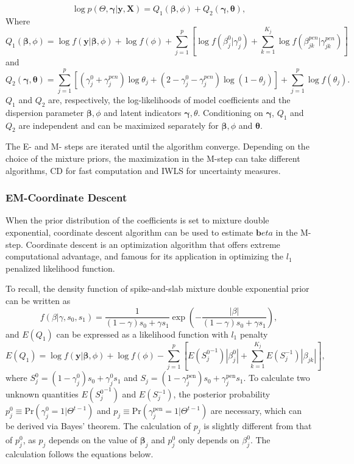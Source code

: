 \documentclass[AMA,STIX1COL,]{WileyNJD-v2}
\begin{document}
\[ \log p(\Theta, \boldsymbol{\gamma}| \textbf{y}, \textbf{X}) = Q_1(\boldsymbol{\beta}, \phi) + Q_2 (\boldsymbol{\gamma},\boldsymbol{\theta}),\]
Where
\[ Q_1(\boldsymbol{\beta}, \phi) = \log f(\textbf{y}|\boldsymbol{\beta}, \phi) + \log f(\phi) + \sum\limits_{j=1}^p\left[\log f(\beta^0_j|\gamma^0_j)+\sum\limits_{k=1}^{K_j} \log f(\beta^{pen}_{jk}|\gamma^{pen}_{jk})\right]\]
and \[
Q_2(\boldsymbol{\gamma},\boldsymbol{\theta}) = \sum\limits_{j=1}^{p} \left[ (\gamma^0_j+\gamma_{j}^{pen})\log \theta_j + (2-\gamma^0_j-\gamma_{j}^{pen}) \log (1-\theta_j)\right] +  \sum\limits_{j=1}^{p}\log f(\theta_j) .\]
\(Q_1\) and \(Q_2\) are, respectively, the log-likelihoods of model
coefficients and the dispersion parameter \(\boldsymbol{\beta}, \phi\)
and latent indicators \(\boldsymbol{\gamma}, \theta\). Conditioning on
\(\boldsymbol{\gamma}\), \(Q_1\) and \(Q_2\) are independent and can be
maximized separately for \(\boldsymbol{\beta}, \phi\) and
\(\boldsymbol{\theta}\).

The E- and M- steps are iterated until the algorithm converge. Depending
on the choice of the mixture priors, the maximization in the M-step can
take different algorithms, CD for fast computation and IWLS for
uncertainty measures.

\hypertarget{em-coordinate-descent}{%
\subsubsection{EM-Coordinate Descent}\label{em-coordinate-descent}}

When the prior distribution of the coefficients is set to mixture double
exponential, coordinate descent algorithm can be used to estimate
\(\boldsymbol{b}eta\) in the M-step. Coordinate descent is an
optimization algorithm that offers extreme computational advantage, and
famous for its application in optimizing the \(l_1\) penalized
likelihood function.

To recall, the density function of spike-and-slab mixture double
exponential prior can be written as \[
f(\beta|\gamma, s_0, s_1) = \frac{1}{(1-\gamma)s_0 + \gamma s_1}\exp(-\frac{|\beta|}{(1-\gamma)s_0 + \gamma s_1}),
\] and \(E(Q_1)\) can be expressed as a likelihood function with \(l_1\)
penalty \begin{equation}\label{eq:Q1_CD}
E(Q_1) = \log f(\textbf{y}|\boldsymbol{\beta}, \phi) + \log f(\phi) - \sum\limits_{j=1}^p\left[E({S^0_j}^{-1})|\beta^0_j|+\sum\limits_{k=1}^{K_j}E(S^{-1}_{j})|\beta_{jk}|\right],
\end{equation} where
\(S_{j}^0 = (1-\gamma^{0}_{j}) s_0 + \gamma^{0}_{j} s_1\) and
\(S_{j} = (1-\gamma^\text{pen}_{j}) s_0 + \gamma^\text{pen}_{j} s_1\).
To calculate two unknown quantities \(E({S_j^0}^{-1})\) and
\(E(S^{-1}_j)\), the posterior probability
\(p^0_{j} \equiv \text{Pr}(\gamma^{0}_{j}=1|\Theta^{t-1})\) and
\(p_{j} \equiv \text{Pr}(\gamma^\text{pen}_{j}=1|\Theta^{t-1})\) are
necessary, which can be derived via Bayes' theorem. The calculation of
\(p_j\) is slightly different from that of \(p^0_j\), as \(p_j\) depends
on the value of \(\boldsymbol{\beta}_{j}\) and \(p^0_j\) only depends on
\(\beta_j^0\). The calculation follows the equations below.
\end{document}
